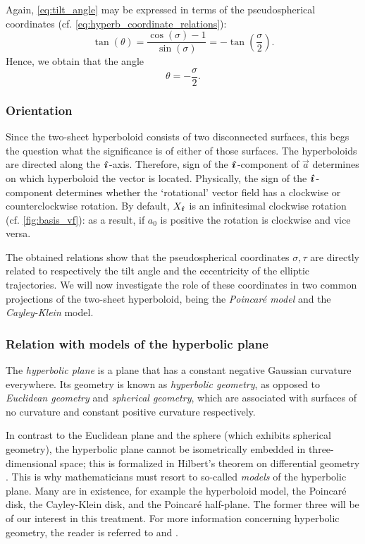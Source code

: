 Again, \cref{eq:tilt_angle} may be expressed in terms of the pseudospherical coordinates (cf. \cref{eq:hyperb_coordinate_relations}):
\begin{equation}
     \tan(\theta) = \frac{\cos(\sigma) - 1}{\sin(\sigma)} = -\tan(\frac{\sigma}{2}).
\end{equation}
Hence, we obtain that the angle 
\begin{equation}
     \theta = -\frac{\sigma}{2}.
\end{equation}

\subsubsection{Orientation} Since the two-sheet hyperboloid consists of two disconnected surfaces, this begs the question what the significance is of either of those surfaces. The hyperboloids are directed along the \(\quati\)-axis. Therefore, sign of the \(\quati\)-component of \(\vec{a}\) determines on which hyperboloid the vector is located. Physically, the sign of the \(\quati\)-component determines whether the `rotational' vector field has a clockwise or counterclockwise rotation. By default, \(X_\quati\) is an infinitesimal clockwise rotation (cf. \cref{fig:basis_vf}): as a result, if \(a_0\) is positive the rotation is clockwise and vice versa.

The obtained relations show that the pseudospherical coordinates \(\sigma, \tau\) are directly related to respectively the tilt angle and the eccentricity of the elliptic trajectories. We will now investigate the role of these coordinates in two common projections of the two-sheet hyperboloid, being the \emph{Poincaré model} and the \emph{Cayley-Klein} model.

\subsubsection{Relation with models of the hyperbolic plane}
The \emph{hyperbolic plane} is a plane that has a constant negative Gaussian curvature everywhere. Its geometry is known as \emph{hyperbolic geometry}, as opposed to \emph{Euclidean geometry} and \emph{spherical geometry}, which are associated with surfaces of no curvature and constant positive curvature respectively. 

In contrast to the Euclidean plane and the sphere (which exhibits spherical geometry), the hyperbolic plane cannot be isometrically embedded in three-dimensional space; this is formalized in Hilbert's theorem on differential geometry \cite{Thurston1997}. This is why mathematicians must resort to so-called \emph{models} of the hyperbolic plane. Many are in existence, for example the hyperboloid model, the Poincaré disk, the Cayley-Klein disk, and the Poincaré half-plane. The former three will be of our interest in this treatment. For more information concerning hyperbolic geometry, the reader is referred to \citet{Needham1997,Needham2021} and \citet{Thurston1997}.


